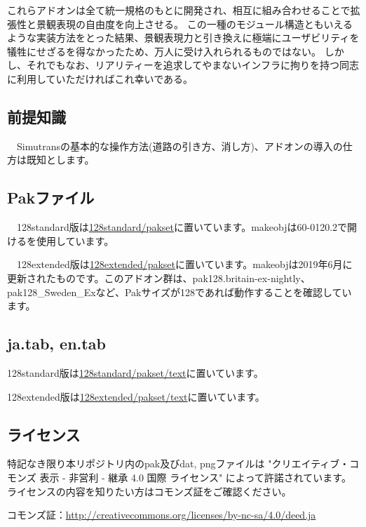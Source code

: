 \documentclass{jbook}
\begin{document}
これらアドオンは全て統一規格のもとに開発され、相互に組み合わせることで拡張性と景観表現の自由度を向上させる。
この一種のモジュール構造ともいえるような実装方法をとった結果、景観表現力と引き換えに極端にユーザビリティを犠牲にせざるを得なかったため、万人に受け入れられるものではない。
しかし、それでもなお、リアリティーを追求してやまないインフラに拘りを持つ同志に利用していただければこれ幸いである。

\subsection*{前提知識}
　Simutransの基本的な操作方法(道路の引き方、消し方)、アドオンの導入の仕方は既知とします。

\subsection*{Pakファイル}
　128standard版は\href{https://github.com/anoKTOK/Yokubari_roads_set_ver_anoKTOK/tree/main/128standard/pakset}{128standard/pakset}に置いています。makeobjは60-0120.2で開けるを使用しています。

　128extended版は\href{https://github.com/anoKTOK/Yokubari_roads_set_ver_anoKTOK/tree/main/128extended/pakset}{128extended/pakset}に置いています。makeobjは2019年6月に更新されたものです。このアドオン群は、pak128.britain-ex-nightly、pak128{\_}Sweden{\_}Exなど、Pakサイズが128であれば動作することを確認しています。

\subsection*{ja.tab, en.tab}
128standard版は\href{https://github.com/anoKTOK/Yokubari_roads_set_ver_anoKTOK/tree/main/128standard/pakset/text}{128standard/pakset/text}に置いています。

128extended版は\href{https://github.com/anoKTOK/Yokubari_roads_set_ver_anoKTOK/tree/main/128extended/pakset/text}{128extended/pakset/text}に置いています。


\subsection*{ライセンス}
特記なき限り本リポジトリ内のpak及びdat, pngファイルは
"クリエイティブ・コモンズ 表示 - 非営利 - 継承 4.0 国際 ライセンス"
によって許諾されています。ライセンスの内容を知りたい方はコモンズ証をご確認ください。

コモンズ証：\href{http://creativecommons.org/licenses/by-nc-sa/4.0/deed.ja}{http://creativecommons.org/licenses/by-nc-sa/4.0/deed.ja}
\end{document}
